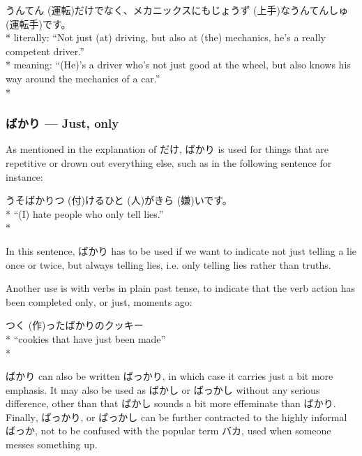 \documentclass[11pt, b5paper, twoside, openright, onecolumn]{book}
\makeatletter
\newcommand*{\rubystack}[2]{{\relscale{0.5}%
  \begin{tabular}[b]{@{}c@{}}%
    {#1}\\%
   {\textscale{2}{#2}}%
  \end{tabular}}%
}
\DeclareRobustCommand*{\ruby}[2]{%
  \mbox{%
    \setlength{\parskip}{0ex}%
    \BeginAccSupp{method=pdfstringdef,ActualText={#1}}%
      \rubystack{\phantom{#2}}{#1}%
      \llap{%
        \rubystack{#2}{\phantom{#1}}%
      }%
    \EndAccSupp{}%
  }%
}
\renewcommand*{\ruby}[2]{#2 (#1)}%
\newenvironment{exampleblock}{
\setlength{\parindent}{0.6in}
\begin{minipage}[t]{\dimexpr\textwidth-\parindent}}
{\end{minipage}}
\makeatother
\begin{document}
\vspace{0.4cm}
\begin{exampleblock}
\ruby{運転}{うんてん}だけでなく、メカニックスにも\ruby{上手}{じょうず}な\ruby{運転手}{うんてんしゅ}です。 \\* 
literally: “Not just (at) driving‚ but also at (the) mechanics‚ he’s a really competent driver.” \\* 
meaning: “(He)’s a driver who’s not just good at the wheel‚ but also knows his way around the mechanics of a car.” \\* 
\end{exampleblock}
\subsubsection{ばかり — Just‚ only}


As mentioned in the explanation of だけ‚ ばかり is used for things that are repetitive or drown out everything else‚ such as in the following sentence for instance:

\vspace{0.4cm}
\begin{exampleblock}
うそばかり\ruby{付}{つ}ける\ruby{人}{ひと}が\ruby{嫌}{きら}いです。 \\* 
“(I) hate people who only tell lies.” \\* 
\end{exampleblock}
\vspace{0.2cm}

In this sentence‚ ばかり has to be used if we want to indicate not just telling a lie once or twice‚ but always telling lies‚ i.e. only telling lies rather than truths.

Another use is with verbs in plain past tense‚ to indicate that the verb action has been completed only‚ or just‚ moments ago:

\vspace{0.4cm}
\begin{exampleblock}
\ruby{作}{つく}ったばかりのクッキー \\* 
“cookies that have just been made” \\* 
\end{exampleblock}
\vspace{0.2cm}

ばかり can also be written ばっかり‚ in which case it carries just a bit more emphasis. It may also be used as ばかし or ばっかし without any serious difference‚ other than that ばかし sounds a bit more effeminate than ばかり. Finally‚ ばっかり‚ or ばっかし can be further contracted to the highly informal ばっか‚ not to be confused with the popular term バカ‚ used when someone messes something up.
\end{document}
